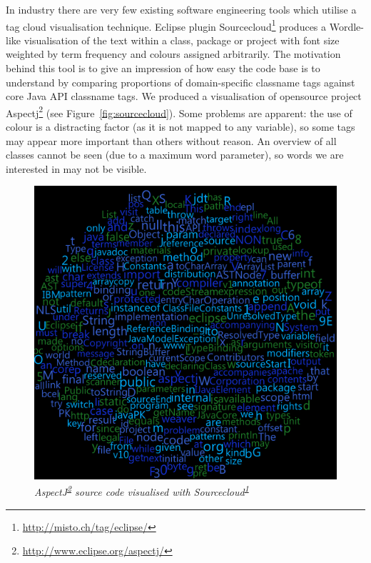 In industry there are very few existing software engineering tools which utilise a tag cloud visualisation technique. Eclipse plugin Sourcecloud\footnote{\label{sourcecloud}\url{http://misto.ch/tag/eclipse/}} produces a Wordle-like visualisation of the text within a class, package or project with font size weighted by term frequency and colours assigned arbitrarily. The motivation behind this tool is to give an impression of how easy the code base is to understand by comparing proportions of domain-specific classname tags against core Java API classname tags.  We produced a visualisation of opensource project Aspectj\footnote{\label{aspectj}\url{http://www.eclipse.org/aspectj/}} (see Figure~\vref{fig:sourcecloud}). Some problems are apparent: the use of colour is a distracting factor (as it is not mapped to any variable), so some tags may appear more important than others without reason. An overview of all classes cannot be seen (due to a maximum word parameter), so words we are interested in may not be visible.

\begin{figure}[!htb]
   	\centering
  	\includegraphics[scale=0.70]{sourcecloud.png}	
	\caption{\textit{AspectJ\textsuperscript{\ref{aspectj}} source code visualised with Sourcecloud\textsuperscript{\ref{sourcecloud}} }}
	\label{fig:sourcecloud}
\end{figure}

